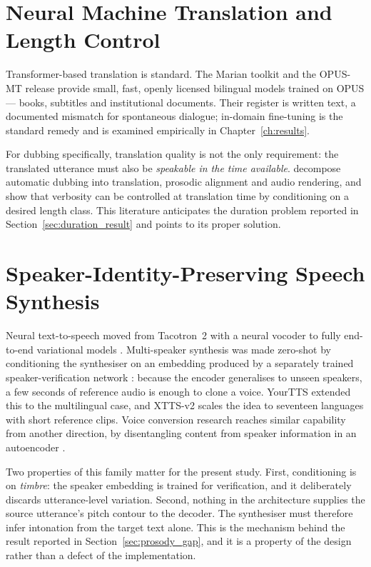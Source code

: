 \section{Neural Machine Translation and Length Control}
\label{sec:lit_mt}

Transformer-based translation \cite{vaswani2017attention} is standard. The Marian toolkit
\cite{junczysdowmunt2018marian} and the OPUS-MT release \cite{tiedemann2020opusmt} provide small,
fast, openly licensed bilingual models trained on OPUS --- books, subtitles and institutional
documents. Their register is written text, a documented mismatch for spontaneous dialogue;
in-domain fine-tuning is the standard remedy and is examined empirically in
Chapter~\ref{ch:results}.

For dubbing specifically, translation quality is not the only requirement: the translated utterance
must also be \emph{speakable in the time available}.  decompose automatic
dubbing into translation, prosodic alignment and audio rendering, and 
show that verbosity can be controlled at translation time by conditioning on a desired length
class. This literature anticipates the duration problem reported in
Section~\ref{sec:duration_result} and points to its proper solution.

\section{Speaker-Identity-Preserving Speech Synthesis}
\label{sec:lit_tts}

Neural text-to-speech moved from Tacotron~2 with a neural vocoder
\cite{shen2018tacotron2,kong2020hifigan} to fully end-to-end variational models
\cite{kim2021vits}. Multi-speaker synthesis was made zero-shot by conditioning the synthesiser on
an embedding produced by a separately trained speaker-verification network
\cite{jia2018sv2tts}: because the encoder generalises to unseen speakers, a few seconds of reference
audio is enough to clone a voice. YourTTS \cite{casanova2022yourtts} extended this to the
multilingual case, and XTTS-v2 \cite{casanova2024xtts} scales the idea to seventeen languages with
short reference clips. Voice conversion research reaches similar capability from another direction,
by disentangling content from speaker information in an autoencoder \cite{qian2019autovc}.

Two properties of this family matter for the present study. First, conditioning is on
\emph{timbre}: the speaker embedding is trained for verification, and it deliberately discards
utterance-level variation. Second, nothing in the architecture supplies the source utterance's pitch
contour to the decoder. The synthesiser must therefore infer intonation from the target text alone.
This is the mechanism behind the result reported in Section~\ref{sec:prosody_gap}, and it is a
property of the design rather than a defect of the implementation.

